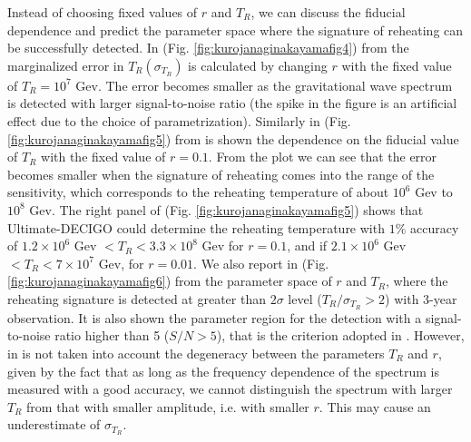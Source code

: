 \documentclass[11pt,a4paper,twoside]{book}
\begin{document}
Instead of choosing fixed values of $ r $ and $ T_{R} $, we can discuss the fiducial dependence and predict the parameter space where the signature of reheating can be successfully detected. In (Fig. \ref{fig:kurojanaginakayamafig4}) from \cite{Chap3:ProspectsForDeterminationWithDetectors} the marginalized error in $ T_{R}(\sigma_{T_{R}})$							
is calculated by changing $ r $ with the fixed value of $ T_{R}=10^{7} $ Gev. The error becomes smaller as the gravitational wave spectrum is detected with larger signal-to-noise ratio (the spike in the figure is an artificial effect due to the choice of parametrization). Similarly in (Fig. \ref{fig:kurojanaginakayamafig5}) from \cite{Chap3:ProspectsForDeterminationWithDetectors} is shown the dependence on the fiducial value of $ T_{R} $ with the fixed value of $ r = 0.1 $. From the plot we can see that the error becomes smaller when the signature of reheating comes into the range of the sensitivity, which corresponds to the reheating temperature of about $ 10^{6} $ Gev to $ 10^{8} $ Gev. The right panel of (Fig. \ref{fig:kurojanaginakayamafig5}) shows that Ultimate-DECIGO could determine the reheating temperature with $ 1 \% $ accuracy of $ 1.2 \times 10^{6} $ Gev $ < T_{R} <  3.3 \times 10^{8} $ Gev for $ r=0.1 $, and if $ 2.1 \times 10^{6} $ Gev  $ < T_{R} < 7 \times 10^{7} $ Gev, for $ r=0.01 $. We also report in (Fig. \ref{fig:kurojanaginakayamafig6}) from \cite{Chap3:ProspectsForDeterminationWithDetectors}  the parameter space of $ r $ and $ T_{R} $, where the reheating signature is detected at greater than $ 2\sigma $ level ($ T_{R} / \sigma_{T_{R}}  > 2$)  with 3-year observation. It is also shown the parameter region for the detection with a signal-to-noise ratio higher than 5 ($ S/N > 5 $), that is the criterion adopted in \cite{Chap3:ProibingReheatingTemperature2008}. However, in \cite{Chap3:ProibingReheatingTemperature2008} is not taken into account the degeneracy between the parameters $ T_{R} $ and $ r $, given by the fact that as long as the frequency dependence of the spectrum is measured with a good accuracy, we cannot distinguish the spectrum with larger $ T_{R} $ from that with smaller amplitude, i.e. with smaller $ r $. This may cause an underestimate of $ \sigma_{T_{R}} $.
\end{document}
